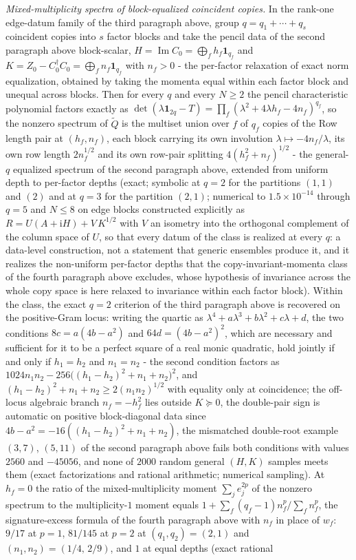 \emph{Mixed-multiplicity spectra of block-equalized coincident copies.} In the rank-one edge-datum family of the third paragraph above, group \(q=q_1+\cdots+q_s\) coincident copies into \(s\) factor blocks and take the pencil data of the second paragraph above block-scalar, \(H=\operatorname{Im}C_0=\bigoplus_f h_f\mathbf 1_{q_f}\) and \(K=Z_0-C_0^\dagger C_0=\bigoplus_f n_f\mathbf 1_{q_f}\) with \(n_f>0\) - the per-factor relaxation of exact norm equalization, obtained by taking the momenta equal within each factor block and unequal across blocks. Then for every \(q\) and every \(N\ge2\) the pencil characteristic polynomial factors exactly as \(\det(\lambda\mathbf 1_{2q}-T)=\prod_f(\lambda^{2}+4\lambda h_f-4n_f)^{q_f}\), so the nonzero spectrum of \(\widetilde Q\) is the multiset union over \(f\) of \(q_f\) copies of the Row length pair at \((h_f,n_f)\), each block carrying its own involution \(\lambda\mapsto-4n_f/\lambda\), its own row length \(2n_f^{1/2}\) and its own row-pair splitting \(4(h_f^{2}+n_f)^{1/2}\) - the general-\(q\) equalized spectrum of the second paragraph above, extended from uniform depth to per-factor depths (exact; symbolic at \(q=2\) for the partitions \((1,1)\) and \((2)\) and at \(q=3\) for the partition \((2,1)\); numerical to \(1.5\times10^{-14}\) through \(q=5\) and \(N\le8\) on edge blocks constructed explicitly as \(R=U(A+\mathrm iH)+V\,K^{1/2}\) with \(V\) an isometry into the orthogonal complement of the column space of \(U\), so that every datum of the class is realized at every \(q\): a data-level construction, not a statement that generic ensembles produce it, and it realizes the non-uniform per-factor depths that the copy-invariant-momenta class of the fourth paragraph above excludes, whose hypothesis of invariance across the whole copy space is here relaxed to invariance within each factor block). Within the class, the exact \(q=2\) criterion of the third paragraph above is recovered on the positive-Gram locus: writing the quartic as \(\lambda^{4}+a\lambda^{3}+b\lambda^{2}+c\lambda+d\), the two conditions \(8c=a(4b-a^{2})\) and \(64d=(4b-a^{2})^{2}\), which are necessary and sufficient for it to be a perfect square of a real monic quadratic, hold jointly if and only if \(h_1=h_2\) and \(n_1=n_2\) - the second condition factors as \(1024n_1n_2-256\bigl((h_1-h_2)^{2}+n_1+n_2\bigr)^{2}\), and \((h_1-h_2)^{2}+n_1+n_2\ge2(n_1n_2)^{1/2}\) with equality only at coincidence; the off-locus algebraic branch \(n_f=-h_f^{2}\) lies outside \(K\succeq0\), the double-pair sign is automatic on positive block-diagonal data since \(4b-a^{2}=-16((h_1-h_2)^{2}+n_1+n_2)\), the mismatched double-root example \((3,7)\), \((5,11)\) of the second paragraph above fails both conditions with values \(2560\) and \(-45056\), and none of \(2000\) random general \((H,K)\) samples meets them (exact factorizations and rational arithmetic; numerical sampling). At \(h_f=0\) the ratio of the mixed-multiplicity moment \(\sum_j e_j^{2p}\) of the nonzero spectrum to the multiplicity-\(1\) moment equals \(1+\sum_f(q_f-1)n_f^{p}/\sum_f n_f^{p}\), the signature-excess formula of the fourth paragraph above with \(n_f\) in place of \(w_f\): \(9/17\) at \(p=1\), \(81/145\) at \(p=2\) at \((q_1,q_2)=(2,1)\) and \((n_1,n_2)=(1/4,\,2/9)\), and \(1\) at equal depths (exact rational 